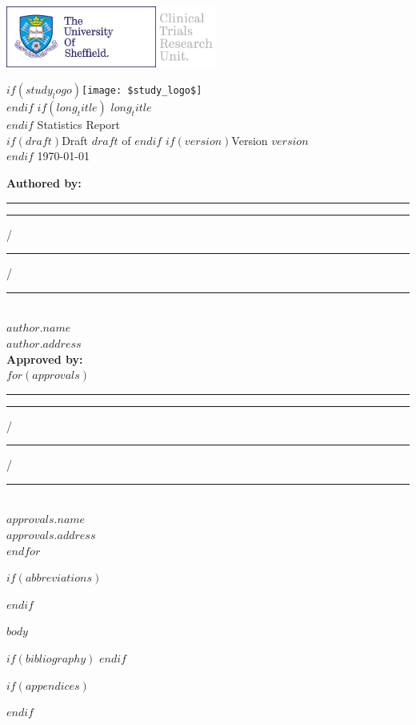 \documentclass[11pt,a4paper,british]{article}
\begin{document}
\thispagestyle{empty}

\includegraphics[height=2cm]{Images/TUOSLogo}\includegraphics[height=2cm]{Images/CTRULogo}
\begin{center}
$if(study_logo) $\texttt{[image: \$study\_logo\$]}\\ $endif$
$if(long_title)$ $long_title$\\[5mm] $endif$
{\Huge Statistics Report}\\
$if(draft)${\Large Draft $draft$ of }$endif$ $if(version)${\Large Version $version$}\\$endif$
{\Large \today}
\end{center}

\begin{singlespace}
\textbf{Authored by:}\\[1cm]
\rule{5cm}{1pt}\hspace{5cm}\rule{1cm}{1pt} /\rule{1cm}{1pt} /\rule{2cm}{1pt}\\
\textit{$author.name$\\
$author.address$}\\[3mm]
\textbf{Approved by:}\\[1cm]
$for(approvals)$
\rule{5cm}{1pt}\hspace{5cm}\rule{1cm}{1pt} /\rule{1cm}{1pt} /\rule{2cm}{1pt}\\
\textit{$approvals.name$\\
$approvals.address$}\\[1cm]
$endfor$
\end{singlespace}

\clearpage
{}
\tableofcontents
\listoftables
\listoffigures

$if(abbreviations)$

$endif$

\clearpage
{}

$body$

$if(bibliography)$
\printbibliography[heading=bibintoc]
$endif$

$if(appendices)$
\begin{appendices}



\end{appendices}
$endif$
\end{document}
